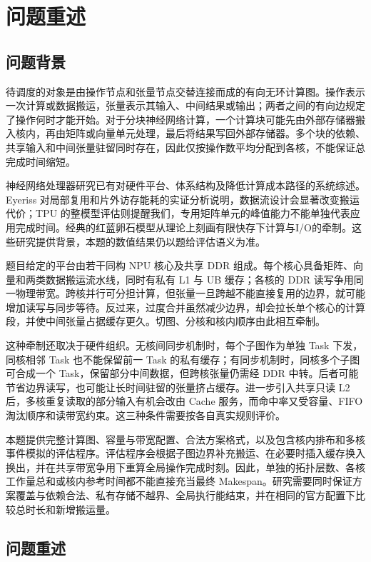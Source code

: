\section{问题重述}
\subsection{问题背景}

待调度的对象是由操作节点和张量节点交替连接而成的有向无环计算图。操作表示一次计算或数据搬运，张量表示其输入、中间结果或输出；两者之间的有向边规定了操作何时才能开始。对于分块神经网络计算，一个计算块可能先由外部存储器搬入核内，再由矩阵或向量单元处理，最后将结果写回外部存储器。多个块的依赖、共享输入和中间张量驻留同时存在，因此仅按操作数平均分配到各核，不能保证总完成时间缩短。

神经网络处理器研究已有对硬件平台、体系结构及降低计算成本路径的系统综述\cite{sze2017}。Eyeriss 对局部复用和片外访存能耗的实证分析说明，数据流设计会显著改变搬运代价\cite{eyeriss2017}；TPU 的整模型评估则提醒我们，专用矩阵单元的峰值能力不能单独代表应用完成时间\cite{jouppi2017}。经典的红蓝卵石模型从理论上刻画有限快存下计算与I/O的牵制\cite{hongkung1981}。这些研究提供背景，本题的数值结果仍以题给评估语义为准。

题目给定的平台由若干同构 NPU 核心及共享 DDR 组成。每个核心具备矩阵、向量和两类数据搬运流水线，同时有私有 L1 与 UB 缓存；各核的 DDR 读写争用同一物理带宽。跨核并行可分担计算，但张量一旦跨越不能直接复用的边界，就可能增加读写与同步等待。反过来，过度合并虽然减少边界，却会拉长单个核心的计算段，并使中间张量占据缓存更久。切图、分核和核内顺序由此相互牵制。

这种牵制还取决于硬件组织。无核间同步机制时，每个子图作为单独 Task 下发，同核相邻 Task 也不能保留前一 Task 的私有缓存；有同步机制时，同核多个子图可合成一个 Task，保留部分中间数据，但跨核张量仍需经 DDR 中转。后者可能节省边界读写，也可能让长时间驻留的张量挤占缓存。进一步引入共享只读 L2 后，多核重复读取的部分输入有机会改由 Cache 服务，而命中率又受容量、FIFO 淘汰顺序和读带宽约束。这三种条件需要按各自真实规则评价。

本题提供完整计算图、容量与带宽配置、合法方案格式，以及包含核内排布和多核事件模拟的评估程序。评估程序会根据子图边界补充搬运、在必要时插入缓存换入换出，并在共享带宽争用下重算全局操作完成时刻。因此，单独的拓扑层数、各核工作量总和或核内参考时间都不能直接充当最终 Makespan。研究需要同时保证方案覆盖与依赖合法、私有存储不越界、全局执行能结束，并在相同的官方配置下比较总时长和新增搬运量。

\subsection{问题重述}

